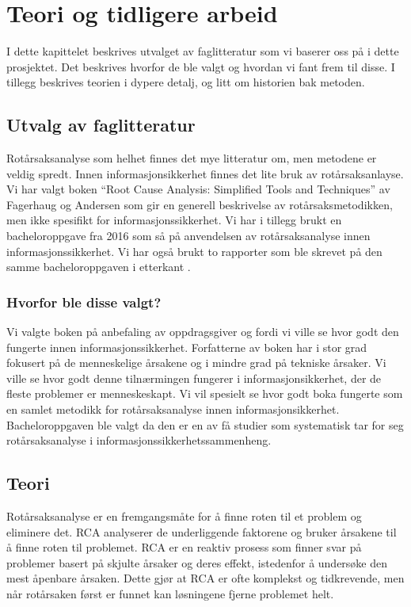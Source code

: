 \chapter{Teori og tidligere arbeid}
\label{kap:teori}
I dette kapittelet beskrives utvalget av faglitteratur som vi baserer oss på i dette prosjektet. Det beskrives hvorfor de ble valgt og hvordan vi fant frem til disse. I tillegg beskrives teorien i dypere detalj, og litt om historien bak metoden. 

\section{Utvalg av faglitteratur}
Rotårsaksanalyse som helhet finnes det mye litteratur om, men metodene er veldig spredt. Innen informasjonsikkerhet finnes det lite bruk av rotårsaksanlayse. Vi har valgt boken ``Root Cause Analysis: Simplified Tools and Techniques'' av Fagerhaug og Andersen \cite{RCA} som gir en generell beskrivelse av rotårsaksmetodikken, men ikke spesifikt for informasjonssikkerhet. Vi har i tillegg brukt en bacheloroppgave fra 2016 \cite{RCARapport} som så på anvendelsen av rotårsaksanalyse innen informasjonssikkerhet. Vi har også brukt to rapporter som ble skrevet på den samme bacheloroppgaven i etterkant \cite{Hellesen:1} \cite{Wangen:1}.

\subsection{Hvorfor ble disse valgt?}
Vi valgte boken \cite{RCA} på anbefaling av oppdragsgiver og fordi vi ville se hvor godt den fungerte innen informasjonssikkerhet. Forfatterne av boken \cite{RCA} har i stor grad fokusert på de menneskelige årsakene og i mindre grad på tekniske årsaker. Vi ville se hvor godt denne tilnærmingen fungerer i informasjonsikkerhet, der de fleste problemer er menneskeskapt. Vi vil spesielt se hvor godt boka fungerte som en samlet metodikk for rotårsaksanalyse innen informasjonsikkerhet. Bacheloroppgaven \cite{RCARapport} ble valgt da den er en av få studier som systematisk tar for seg rotårsaksanalyse i informasjonssikkerhetssammenheng. 

\section{Teori}
Rotårsaksanalyse er en fremgangsmåte for å finne roten til et problem og eliminere det. RCA analyserer de underliggende faktorene og bruker årsakene til å finne roten til problemet. RCA er en reaktiv prosess som finner svar på problemer basert på skjulte årsaker og deres effekt, istedenfor å undersøke den mest åpenbare årsaken. Dette gjør at RCA er ofte komplekst og tidkrevende, men når rotårsaken først er funnet kan løsningene fjerne problemet helt. 

